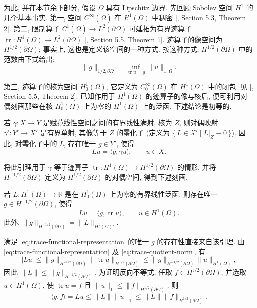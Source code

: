 为此, 并在本节余下部分, 假设 $\Omega$ 具有 Lipschitz 边界. 先回顾 Sobolev 空间 $H^1$ 的几个基本事实. 第一, 空间 $C^\infty(\overline\Omega)$ 在 $H^1(\Omega)$ 中稠密 [, Section 5.3, Theorem 2]. 第二, 限制算子 $C^1(\overline\Omega)\to L^2(\partial\Omega)$ 可延拓为有界迹算子 $\operatorname{tr}:H^1(\Omega)\to L^2(\partial\Omega)$ [, Section 5.5, Theorem 1]. 迹算子的像空间为 $H^{1/2}(\partial\Omega)$; 事实上, 这也是定义该空间的一种方式. 按这种方式, $H^{1/2}(\partial\Omega)$ 中的范数由下式给出:
\begin{equation}\label{eq:trace-quotient-norm}
\|g\|_{1/2,\partial\Omega}=\inf_{\operatorname{tr}u=g}\|u\|_{1,\Omega}.
\end{equation}

第三, 迹算子的核为空间 $ H_0^1(\Omega)$, 它定义为 $C_0^\infty(\Omega)$ 在 $H^1(\Omega)$ 中的闭包. 见 [, Section 5.5, Theorem 2]. 已知作用于 $H^1(\Omega)$ 的迹算子的像与核后, 便可利用对偶刻画那些在核 $ H_0^1(\Omega)$ 上为零的 $H^1(\Omega)$ 上的泛函. 下述结论是初等的.

\begin{Lemma}\label{lem:dual-surjection-annihilator}
若 $\gamma:X\to Y$ 是赋范线性空间之间的有界线性满射, 核为 $Z$, 则对偶映射 $\gamma':Y'\to X'$ 是有界单射, 其像等于 $Z$ 的零化子 (定义为 $\{\,L\in X'\mid L|_Z\equiv0\,\}$). 因此, 对零化子中的 $L$, 存在唯一 $g\in Y'$, 使得
\[
Lu=\langle g,\gamma u\rangle,\qquad u\in X.
\]
\end{Lemma}

将此引理用于 $\gamma$ 等于迹算子 $\operatorname{tr}:H^1(\Omega)\to H^{1/2}(\partial\Omega)$ 的情形, 并将 $H^{-1/2}(\partial\Omega)$ 定义为 $H^{1/2}(\partial\Omega)$ 的对偶空间, 得到下述刻画.

\begin{Proposition}\label{prop:trace-functional-representation}
若 $L:H^1(\Omega)\to\mathbb R$ 是在 $ H_0^1(\Omega)$ 上为零的有界线性泛函, 则存在唯一 $g\in H^{-1/2}(\partial\Omega)$, 使得
\begin{equation}\label{eq:trace-functional-representation}
Lu=\langle g,\operatorname{tr}u\rangle,\qquad u\in H^1(\Omega).
\end{equation}
此外, $\|g\|_{H^{-1/2}(\partial\Omega)}=\|L\|_{H^1(\Omega)'}$.
\end{Proposition}

\begin{Proof}
满足 \eqref{eq:trace-functional-representation} 的唯一 $g$ 的存在性直接来自该引理. 由 \eqref{eq:trace-functional-representation} 及 \eqref{eq:trace-quotient-norm}, 有
\[
|Lu|\leq\|g\|_{H^{-1/2}(\partial\Omega)}\|\operatorname{tr}u\|_{H^{1/2}(\partial\Omega)}\leq\|g\|_{H^{-1/2}(\partial\Omega)}\|u\|_{H^1(\Omega)},
\]
因此 $\|L\|\leq\|g\|_{H^{-1/2}(\partial\Omega)}$. 为证明反向不等式, 任取 $f\in H^{1/2}(\partial\Omega)$, 并选取 $u\in H^1(\Omega)$, 使 $\operatorname{tr}u=f$ 且 $\|u\|_1\leq\|f\|_{H^{1/2}(\partial\Omega)}$. 则
\[
\langle g,f\rangle=Lu\leq\|L\|\|u\|_1\leq\|L\|\|f\|_{H^{1/2}(\partial\Omega)}.
\]
\end{Proof}

